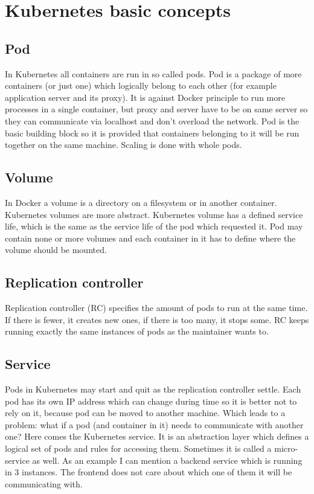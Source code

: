 \chapter{Kubernetes basic concepts}\label{chapter:kubernetes-basic-concepts}

\section{Pod}
In Kubernetes all containers are run in so called pods. Pod is a package of more containers (or just one) which logically belong to each other (for example application server and its proxy). It is against Docker principle to run more processes in a single container, but proxy and server have to be on same server so they can communicate via localhost and don’t overload the network. Pod is the basic building block so it is provided that containers belonging to it will be run together on the same machine. Scaling is done with whole pods.

\section{Volume}
In Docker a volume is a directory on a filesystem or in another container. Kubernetes volumes are more abstract. Kubernetes volume has a defined service life, which is the same as the service life of the pod which requested it. Pod may contain none or more volumes and each container in it has to define where the volume should be mounted.

\section{Replication controller}
Replication controller (RC) specifies the amount of pods to run at the same time. If there is fewer, it creates new ones, if there is too many, it stops some. RC keeps running exactly the same instances of pods as the maintainer wants to. 

\section{Service}
Pods in Kubernetes may start and quit as the replication controller settle. Each pod has its own IP address which can change during time so it is better not to rely on it, because pod can be moved to another machine. Which leads to a problem: what if a pod (and container in it) needs to communicate with another one? Here comes the Kubernetes service. It is an abstraction layer which defines a logical set of pods and rules for accessing them. Sometimes it is called a micro-service as well. As an example I can mention a backend service which is running in 3 instances. The frontend does not care about which one of them it will be communicating with.